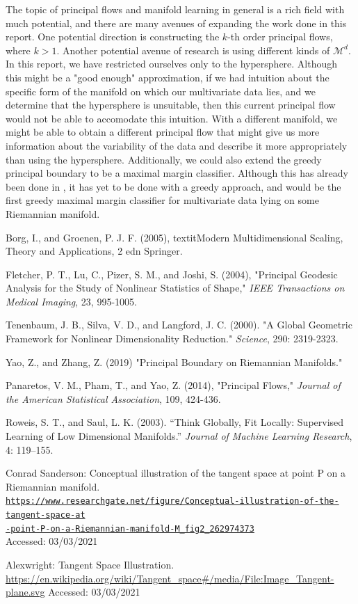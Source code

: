 \documentclass[12pt]{report}
\begin{document}
The topic of principal flows and manifold learning in general is a rich field 
with much potential, and there are many avenues of 
expanding the work done in this report. 
One potential direction is constructing the $k$-th order principal flows, where $k>1$. 
Another potential avenue of research is using different kinds of $\mathcal{M}^d$. 
In this report, we have restricted ourselves only to the hypersphere. Although this 
might be a "good enough" approximation, if we had intuition about the specific form 
of the manifold on which our multivariate data lies, and we determine that the 
hypersphere is unsuitable, then this current principal flow would not be able to 
accomodate this intuition. With a different manifold, we might be able to obtain 
a different principal flow that might give us more information about the 
variability of the data and describe it more appropriately than using the hypersphere. 
Additionally, we could also extend the greedy principal boundary to be a maximal margin
classifier. Although this has already been done in \cite{principalboundary}, 
it has yet to be done with a greedy approach, and would be the first
greedy maximal margin classifier for multivariate data lying on some 
Riemannian manifold.

\begin{thebibliography}{9}

Borg, I., and Groenen, P. J. F. (2005),
textit{Modern Multidimensional Scaling, Theory and Applications}, 
2 edn Springer.

Fletcher, P. T., Lu, C., Pizer, S. M., and Joshi, S. (2004), 
"Principal Geodesic Analysis for the Study of Nonlinear Statistics of Shape," 
\textit{IEEE Transactions on Medical Imaging}, 23, 995-1005.

Tenenbaum, J. B., Silva, V. D., and Langford, J. C. (2000). "A Global
Geometric Framework for Nonlinear Dimensionality Reduction." 
\textit{Science}, 290: 2319-2323.

Yao, Z., and Zhang, Z. (2019) "Principal Boundary on Riemannian Manifolds." 

Panaretos, V. M., Pham, T., and Yao, Z. (2014), 
"Principal Flows," \textit{Journal of the American
Statistical Association}, 109, 424-436.

Roweis, S. T., and Saul, L. K. (2003). “Think Globally, Fit Locally:
Supervised Learning of Low Dimensional Manifolds.” \textit{Journal of Machine
Learning Research}, 4: 119–155.

Conrad Sanderson: Conceptual illustration of the tangent space at point P on a Riemannian manifold.
\\\texttt{\url{https://www.researchgate.net/figure/Conceptual-illustration-of-the-tangent-space-at
-point-P-on-a-Riemannian-manifold-M_fig2_262974373}}\\ Accessed: 03/03/2021

Alexwright: Tangent Space Illustration.\\
\texttt{}
\url{https://en.wikipedia.org/wiki/Tangent_space#/media/File:Image_Tangent-plane.svg}
Accessed: 03/03/2021
\end{thebibliography}
\end{document}
